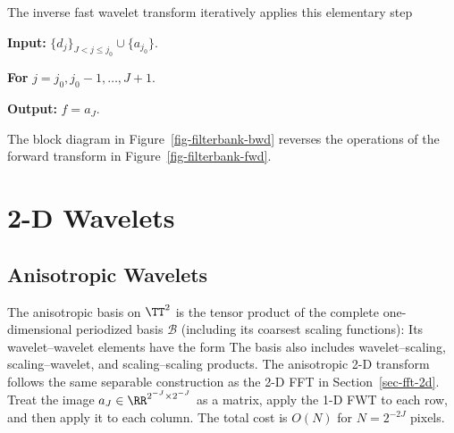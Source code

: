 The inverse fast wavelet transform iteratively applies this elementary step
\begin{rs}
	\item \textbf{Input:} $\{d_j\}_{J<j\leq j_0} \cup \{ a_{j_0} \}$.
	\item \textbf{For} $j=j_0,j_0-1,\ldots,J+1$.
	\item \textbf{Output:} $f = a_J$.
\end{rs}
The block diagram in Figure~\ref{fig-filterbank-bwd} reverses the operations of the forward transform in Figure~\ref{fig-filterbank-fwd}.



\section{2-D Wavelets}

\subsection{Anisotropic Wavelets}

The anisotropic basis on $\TT^2$ is the tensor product of the complete one-dimensional periodized basis $\mathcal B$ (including its coarsest scaling functions):
Its wavelet--wavelet elements have the form
The basis also includes wavelet--scaling, scaling--wavelet, and scaling--scaling products.
The anisotropic 2-D transform follows the same separable construction as the 2-D FFT in Section~\ref{sec-fft-2d}. Treat the image $a_J \in \RR^{2^{-J} \times 2^{-J}}$ as a matrix, apply the 1-D FWT to each row, and then apply it to each column. The total cost is $O(N)$ for $N=2^{-2J}$ pixels.


